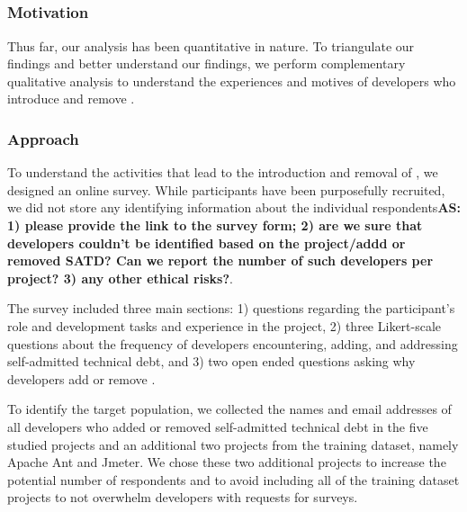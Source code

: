 \subsection*{\rqiv}


\subsubsection*{Motivation} 
Thus far, our analysis has been quantitative in nature. To triangulate our findings and better understand our findings, we perform complementary qualitative analysis to understand the experiences and motives of developers who introduce and remove \SATD.



 
\subsubsection*{Approach} 
To understand the activities that lead to the introduction and removal of \SATD, we designed an online survey. 
While participants have been purposefully recruited, we did not store any identifying information  about the individual respondents\textbf{AS: 1) please provide the link to the survey form; 2) are we sure that developers couldn't be identified based on the project/addd or removed SATD? Can we report the number of such developers per project? 3) any other ethical risks?}.

The survey included three main sections: 1)  questions regarding the participant's role and development tasks and experience in the project, 2) three Likert-scale questions about the frequency of developers encountering, adding, and addressing self-admitted technical debt, and 3) two open ended questions asking why developers add or remove \SATD. 

To identify the target population, we collected the names and email addresses of all developers who added or removed self-admitted technical debt in the five studied projects and an additional two projects from the training dataset, namely Apache Ant and Jmeter. We chose these two additional projects to increase the potential number of respondents and to avoid including all of the training dataset projects to not overwhelm developers with requests for surveys.

